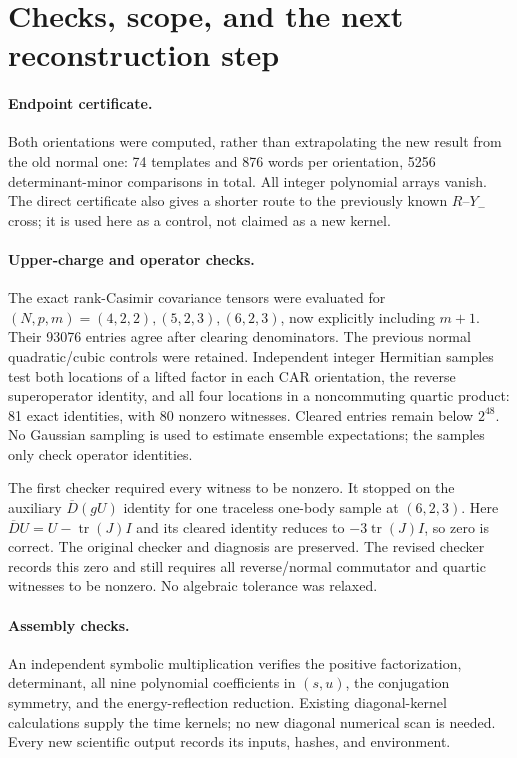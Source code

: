 \documentclass[11pt,a4paper]{article}
\newcommand{\tr}{\operatorname{tr}}
\newcommand{\Db}{\overline D}
\begin{document}
\newpage
\section{Checks, scope, and the next reconstruction step}
\paragraph{Endpoint certificate.}
Both orientations were computed, rather than extrapolating the
new result from the old normal one: 74 templates and 876 words
per orientation, 5256 determinant-minor comparisons in total.
All integer polynomial arrays vanish. The direct certificate
also gives a shorter route to the previously known $R$--$Y_-$
cross; it is used here as a control, not claimed as a new kernel.

\paragraph{Upper-charge and operator checks.}
The exact rank-Casimir covariance tensors were evaluated for
$(N,p,m)=(4,2,2),(5,2,3),(6,2,3)$, now explicitly including
$m+1$. Their 93076 entries agree after clearing denominators.
The previous normal quadratic/cubic controls were retained.
Independent integer Hermitian samples test both locations of a
lifted factor in each CAR orientation, the reverse superoperator
identity, and all four locations in a noncommuting quartic product:
81 exact identities, with 80 nonzero witnesses. Cleared entries
remain below $2^{48}$. No Gaussian sampling is used to estimate
ensemble expectations; the samples only check operator identities.

The first checker required every witness to be nonzero. It stopped
on the auxiliary $\Db(gU)$ identity for one traceless one-body
sample at $(6,2,3)$. Here $\Db U=U-\tr(J)I$ and its cleared
identity reduces to $-3\tr(J)I$, so zero is correct. The original
checker and diagnosis are preserved. The revised checker records
this zero and still requires all reverse/normal commutator and
quartic witnesses to be nonzero. No algebraic tolerance was relaxed.

\paragraph{Assembly checks.}
An independent symbolic multiplication verifies the positive
factorization, determinant, all nine polynomial coefficients in
$(s,u)$, the conjugation symmetry, and the energy-reflection
reduction. Existing diagonal-kernel calculations supply the time
kernels; no new diagonal numerical scan is needed. Every new
scientific output records its inputs, hashes, and environment.
\end{document}

